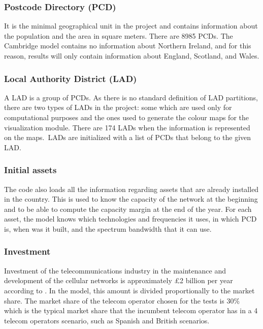\subsubsection*{Postcode Directory (PCD)}
It is the minimal geographical unit in the project and contains information about the population and the area in square meters. There are 8985 PCDs. The Cambridge model contains no information about Northern Ireland, and for this reason, results will only contain information about England, Scotland, and Wales.\par

\subsubsection*{Local Authority District (LAD)}
A LAD is a group of PCDs. As there is no standard definition of LAD partitions, there are two types of LADs in the project: some which are used only for computational purposes and the ones used to generate the colour maps for the visualization module. There are 174 LADs when the information is represented on the maps.\  LADs are initialized with a list of PCDs that belong to the given LAD.\par


\subsubsection*{Initial assets}
The code also loads all the information regarding assets that are already installed in the country. This is used to know the capacity of the network at the beginning and to be able to compute the capacity margin at the end of the year. For each asset, the model knows which technologies and frequencies it uses, in which PCD is, when was it built, and the spectrum bandwidth that it can use.\par


\subsubsection*{Investment}
Investment of the telecommunications industry in the maintenance and development of the cellular networks is approximately £2 billion per year according to \cite{3-06}. In the model, this amount is divided proportionally to the market share. The market share of the telecom operator chosen for the tests is 30$\%$  which is the typical market share that the incumbent telecom operator has in a 4 telecom operators scenario, such as Spanish and British scenarios.\par


